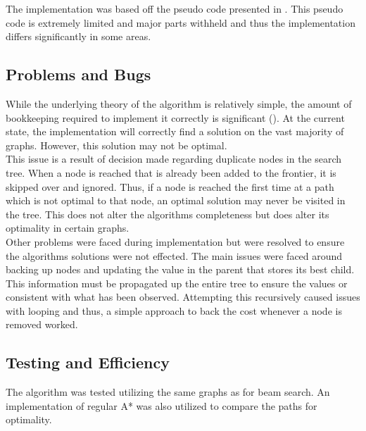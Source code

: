 \documentclass[]{article}
\begin{document}
The implementation was based off the pseudo code presented in \cite{russell_paper}. This pseudo code is extremely limited and major parts withheld and thus the implementation differs significantly in some areas.

\subsection*{Problems and Bugs}

While the underlying theory of the algorithm is relatively simple, the amount of bookkeeping required to implement it correctly is significant (\cite{norvig}). At the current state, the implementation will correctly find a solution on the vast majority of graphs. However, this solution may not be optimal. \\

This issue is a result of decision made regarding duplicate nodes in the search tree. When a node is reached that is already been added to the frontier, it is skipped over and ignored. Thus, if a node is reached the first time at a path which is not optimal to that node, an optimal solution may never be visited in the tree. This does not alter the algorithms completeness but does alter its optimality in certain graphs.\\

Other problems were faced during implementation but were resolved to ensure the algorithms solutions were not effected. The main issues were faced around backing up nodes and updating the value in the parent that stores its best child. This information must be propagated up the entire tree to ensure the values or consistent with what has been observed. Attempting this recursively caused issues with looping and thus, a simple approach to back the cost whenever a node is removed worked.

\subsection*{Testing and Efficiency}

The algorithm was tested utilizing the same graphs as for beam search. An implementation of regular A* was also utilized to compare the paths for optimality.


\break
\setlength{}
\printbibliography[title={References}]

\end{document}
